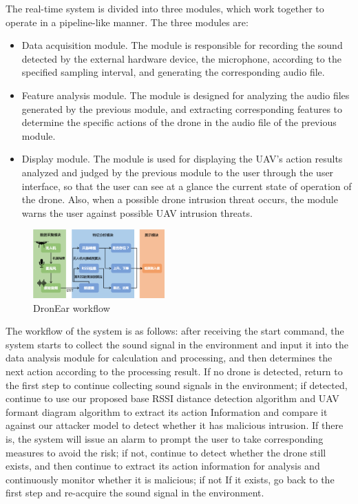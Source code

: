 \documentclass{sig-alternate-10pt}
\begin{document}
 The real-time system is divided into three modules, which work together to operate in a pipeline-like manner. The three modules are:
\begin{itemize}
    \item Data acquisition module. The module is responsible for recording the sound detected by the external hardware device, the microphone, according to the specified sampling interval, and generating the corresponding audio file.
    \item Feature analysis module. The module is designed for analyzing the audio files generated by the previous module, and extracting corresponding features to determine the specific actions of the drone in the audio file of the previous module.
    \item Display module. The module is used for displaying the UAV’s action results analyzed and judged by the previous module to the user through the user interface, so that the user can see at a glance the current state of operation of the drone. Also, when a possible drone intrusion threat occurs, the module warns the user against possible UAV intrusion threats.
\end{itemize}
\begin{figure}[!h]
	\centering
	\includegraphics[width=0.45\textwidth]{pics/workflow.png}
	\caption{DronEar workflow}
	
	\label{workflow}
\end{figure}
The workflow of the system is as follows: after receiving the start command, the system starts to collect the sound signal in the environment and input it into the data analysis module for calculation and processing, and then determines the next action according to the processing result. If no drone is detected, return to the first step to continue collecting sound signals in the environment; if detected, continue to use our proposed base RSSI distance detection algorithm and UAV formant diagram algorithm to extract its action Information and compare it against our attacker model to detect whether it has malicious intrusion. If there is, the system will issue an alarm to prompt the user to take corresponding measures to avoid the risk; if not, continue to detect whether the drone still exists, and then continue to extract its action information for analysis and continuously monitor whether it is malicious; if not If it exists, go back to the first step and re-acquire the sound signal in the environment.
\end{document}

